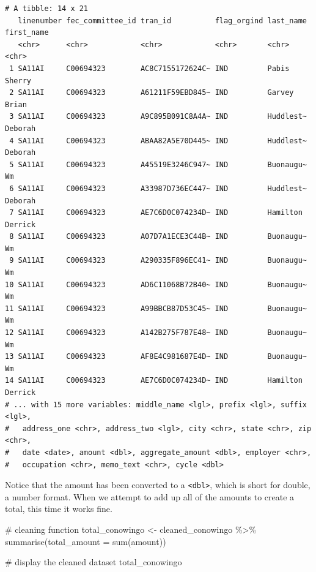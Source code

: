 \documentclass[
  letterpaper,
  DIV=11,
  numbers=noendperiod]{scrreprt}
\newenvironment{Shaded}{\begin{snugshade}}{\end{snugshade}}
\newcommand{\AttributeTok}[1]{\textcolor[rgb]{0.40,0.45,0.13}{#1}}
\newcommand{\CommentTok}[1]{\textcolor[rgb]{0.37,0.37,0.37}{#1}}
\newcommand{\FunctionTok}[1]{\textcolor[rgb]{0.28,0.35,0.67}{#1}}
\newcommand{\NormalTok}[1]{\textcolor[rgb]{0.00,0.23,0.31}{#1}}
\newcommand{\OtherTok}[1]{\textcolor[rgb]{0.00,0.23,0.31}{#1}}
\newcommand{\SpecialCharTok}[1]{\textcolor[rgb]{0.37,0.37,0.37}{#1}}
\begin{document}
\begin{verbatim}
# A tibble: 14 x 21
   linenumber fec_committee_id tran_id          flag_orgind last_name first_name
   <chr>      <chr>            <chr>            <chr>       <chr>     <chr>     
 1 SA11AI     C00694323        AC8C7155172624C~ IND         Pabis     Sherry    
 2 SA11AI     C00694323        A61211F59EBD845~ IND         Garvey    Brian     
 3 SA11AI     C00694323        A9C895B091C8A4A~ IND         Huddlest~ Deborah   
 4 SA11AI     C00694323        ABAA82A5E70D445~ IND         Huddlest~ Deborah   
 5 SA11AI     C00694323        A45519E3246C947~ IND         Buonaugu~ Wm        
 6 SA11AI     C00694323        A33987D736EC447~ IND         Huddlest~ Deborah   
 7 SA11AI     C00694323        AE7C6D0C074234D~ IND         Hamilton  Derrick   
 8 SA11AI     C00694323        A07D7A1ECE3C44B~ IND         Buonaugu~ Wm        
 9 SA11AI     C00694323        A290335F896EC41~ IND         Buonaugu~ Wm        
10 SA11AI     C00694323        AD6C11068B72B40~ IND         Buonaugu~ Wm        
11 SA11AI     C00694323        A99BBCB87D53C45~ IND         Buonaugu~ Wm        
12 SA11AI     C00694323        A142B275F787E48~ IND         Buonaugu~ Wm        
13 SA11AI     C00694323        AF8E4C981687E4D~ IND         Buonaugu~ Wm        
14 SA11AI     C00694323        AE7C6D0C074234D~ IND         Hamilton  Derrick   
# ... with 15 more variables: middle_name <lgl>, prefix <lgl>, suffix <lgl>,
#   address_one <chr>, address_two <lgl>, city <chr>, state <chr>, zip <chr>,
#   date <date>, amount <dbl>, aggregate_amount <dbl>, employer <chr>,
#   occupation <chr>, memo_text <chr>, cycle <dbl>
\end{verbatim}

Notice that the amount has been converted to a
\texttt{\textless{}dbl\textgreater{}}, which is short for double, a
number format. When we attempt to add up all of the amounts to create a
total, this time it works fine.

\begin{Shaded}
\begin{Highlighting}[]
\CommentTok{\# cleaning function}
\NormalTok{total\_conowingo }\OtherTok{\textless{}{-}}\NormalTok{ cleaned\_conowingo }\SpecialCharTok{\%\textgreater{}\%}
  \FunctionTok{summarise}\NormalTok{(}\AttributeTok{total\_amount =} \FunctionTok{sum}\NormalTok{(amount))}

\CommentTok{\# display the cleaned dataset}
\NormalTok{total\_conowingo}
\end{Highlighting}
\end{Shaded}
\end{document}
